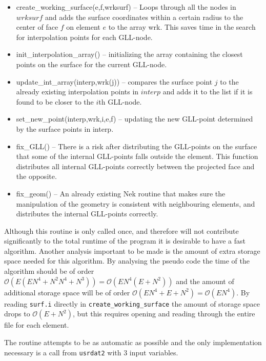 \begin{itemize}
    \item create\_working\_surface(e,f,wrksurf) -- Loops through all the nodes in $wrksurf$ and adds the 
        surface coordinates within a certain radius to the center of face $f$ on element $e$ to the array wrk.
        This saves time in the search for interpolation points for each GLL-node.
    \item init\_interpolation\_array() -- initializing the array containing the closest 
        points on the surface for the current GLL-node. 
    \item update\_int\_array(interp,wrk(j)) -- compares the surface point $j$ to the 
        already existing interpolation points in $interp$ and adds it to the list if it is found to 
        be closer to the $i$th GLL-node.
    \item set\_new\_point(interp,wrk,i,e,f) -- updating the new GLL-point determined by the 
        surface points in interp.
    \item fix\_GLL() -- There is a risk after distributing the GLL-points on the surface that
        some of the internal GLL-points falls outside the element. This function distributes 
        all internal GLL-points correctly between the projected face and the opposite.
    \item fix\_geom() -- An already existing Nek routine that makes sure the manipulation of the 
        geometry is consistent with neighbouring elements, and distributes the internal GLL-points correctly.
\end{itemize}

Although this routine is only called once, and therefore will not contribute significantly 
to the total runtime of the program it is desirable to have a fast algorithm. Another analysis
important to be made is the amount of extra storage space needed for this algorithm.
By analysing the pseudo code the time of the algorithm should be of order $\mathcal{O}(E(EN^4+N^2N^4+N^3))=\mathcal{O}(EN^4(E+N^2))$
and the amount of additional storage space will be of order $\mathcal{O}(EN^4+E+N^2)=\mathcal{O}(EN^4)$.
By reading \verb|surf.i| directly in \verb|create_working_surface| the amount of storage space drops to $\mathcal{O}(E+N^2)$,
but this requires opening and reading through the entire file for each element.


The routine attempts to be as automatic as possible and the only implementation necessary is 
a call from \verb|usrdat2| with 3 input variables.

